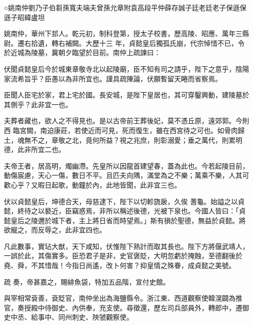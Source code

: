 
\begin{pinyinscope}

 ○姚南仲劉乃子伯芻孫寬夫端夫曾孫允章附袁高段平仲薛存誠子廷老廷老子保遜保遜子昭緯盧坦



 姚南仲，華州下邽人。乾元初，制科登第，授太子校書，歷高陵、昭應、萬年三縣尉。遷右拾遺，轉右補闕。大歷十三
 年，貞懿皇后獨孤氏崩，代宗悼惜不已，令於近城為陵墓，冀朝夕臨望於目前。南仲上疏諫曰：



 伏聞貞懿皇后今於城東章敬寺北以起陵廟，臣不知有司之請乎，陛下之意乎，陰陽家流希旨乎？臣愚以為非所宜也。謹具疏陳論，伏願暫留天睠而省察焉。



 臣聞人臣宅於家，君上宅於國。長安城，是陛下皇居也，其可穿鑿興動，建陵墓於其側乎？此非宜一也。



 夫葬者藏也，欲人之不得見也。是以古帝前王葬後妃，莫不憑丘原，遠郊郭。今則西
 臨宮闕，南迫康莊，若使近而可見，死而復生，雖在西宮待之可也。如骨肉歸土，魂無不之，章敬之北，竟何所益？視之兆庶，則彰溺愛；垂之萬代，則累明德，此非所宜二也。



 夫帝王者，居高明，燭幽滯。先皇所以因龍首建望春，蓋為此也。今若起陵目前，動傷宸慮，天心一傷，數日不平。且匹夫向隅，滿堂為之不樂；萬乘不樂，人其可歡心乎？又暇日起歌，動鐘於內，此地皆聞，此非宜三也。



 伏以貞懿皇后，坤德合天，母慈逮下，陛下以切軫旒扆，久俟
 蓍龜。始謚之以貞懿，終待之以褻近，臣竊惑焉，非所以稱述後德，光被下泉也。今國人皆曰：「貞懿皇后之陵邇於城下者，主上將日省而時望焉。」斯有損於聖德，無益於貞懿。將欲寵之，而反辱之，此非宜四也。



 凡此數事，實玷大猷，天下咸知，伏惟陛下熟計而取其長也。陛下方將偃武靖人，一誤於此，其傷實多。臣恐君子是非，史官褒貶，大明忽虧於掩蝕，至德翻後於堯、舜，不其惜哉！今指日尚遙，改卜何害？抑皇情之殊眷，成貞懿之美號。



 疏
 奏，帝甚嘉之，賜緋魚袋，特加五品階，宣付史館。



 與宰相常袞善，袞貶官，南仲坐出為海鹽縣令。浙江東、西道觀察使韓滉闢為推官，奏授殿中侍御史、內供奉，充支使。尋徵還，歷左司兵部員外，轉郎中，遷御史中丞、給事中、同州刺史、陜虢觀察使。




\end{pinyinscope}
